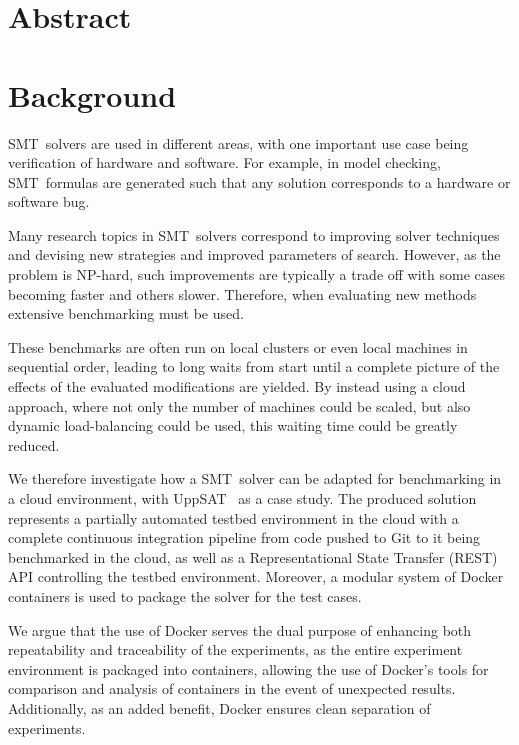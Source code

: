 \documentclass{article}
\begin{document}


\begin{multicols}{2}

\section*{Abstract}

\textbf{ \textit {  }}

\section*{Background}

SMT~solvers are used in different areas, with one important use case being
verification of hardware and software. For example, in model checking,
SMT~formulas are generated such that any solution corresponds to a hardware or
software bug.

Many research topics in SMT~solvers correspond to improving solver techniques
and devising new strategies and improved parameters of search. However, as the
problem is NP-hard, such improvements are typically a trade off with some cases
becoming faster and others slower. Therefore, when evaluating new methods
extensive benchmarking must be used.

These benchmarks are often run on local clusters or even local machines in
sequential order, leading to long waits from start until a complete picture of
the effects of the evaluated modifications are yielded. By instead using a cloud
approach, where not only the number of machines could be scaled, but also
dynamic load-balancing could be used, this waiting time could be greatly
reduced.

We therefore investigate how a SMT~solver can be adapted for benchmarking in a
cloud environment, with UppSAT~\cite{uppsat} as a case study. The produced
solution represents a partially automated testbed environment in the cloud with
a complete continuous integration pipeline from code pushed to Git to it being
benchmarked in the cloud, as well as a Representational State Transfer (REST)
API controlling the testbed environment. Moreover, a modular system of Docker
containers is used to package the solver for the test cases.

We argue that the use of Docker serves the dual purpose of enhancing both
repeatability and traceability of the experiments, as the entire experiment
environment is packaged into containers, allowing the use of Docker's tools for
comparison and analysis of containers in the event of unexpected results.
Additionally, as an added benefit, Docker ensures clean separation of
experiments.


\end{multicols}
\end{document}
